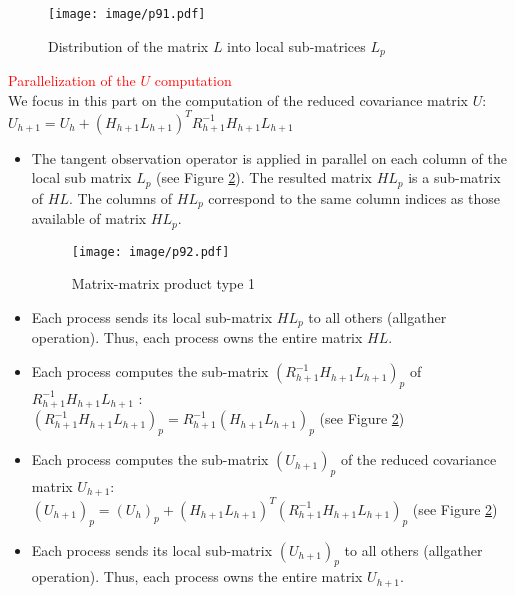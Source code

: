 \documentclass{tufte-book}
\begin{document}
   \begin{figure}[htpb]
    \texttt{[image: image/p91.pdf]}
    \label{l_distribution}
    \caption{Distribution of the matrix $L$ into local sub-matrices $L_p$}
  \end{figure}

  \par \textcolor{red}{Parallelization of the $U$ computation}\\

  We focus in this part on the computation of the reduced covariance matrix $U$:\\
 $ U_{h+1} = U_h +  (H_{h+1}L_{h+1})^T R_{h+1}^{-1} H_{h+1}L_{h+1}$\\


  \begin{itemize}

\item The tangent observation operator is applied in parallel on each column of the local sub matrix $L_p$ (see Figure \ref{matrix_1}). The resulted matrix $HL_p$ is a sub-matrix of $HL$. The columns of $HL_p$ correspond to the same column indices as those available of matrix $HL_p$.

\begin{figure}[htpb]
        \texttt{[image: image/p92.pdf]}
        \caption{Matrix-matrix product type 1}
        \label{matrix_1}
\end{figure}


\item Each process sends its local sub-matrix $HL_p$ to all others (allgather operation). Thus, each process owns the entire matrix  $HL$.\\

\item Each process computes the sub-matrix  $(R_{h+1}^{-1} H_{h+1}L_{h+1})_p$ of  $R_{h+1}^{-1} H_{h+1}L_{h+1}$ :\\
$(R_{h+1}^{-1} H_{h+1}L_{h+1})_p = R_{h+1}^{-1} (H_{h+1}L_{h+1})_p$ (see Figure \ref{matrix_1})

\item Each process computes the sub-matrix   $(U_{h+1})_p$  of  the reduced covariance matrix $U_{h+1}$:\\
 $ (U_{h+1})_p = (U_h)_p +  (H_{h+1}L_{h+1})^T (R_{h+1}^{-1} H_{h+1}L_{h+1})_p$ (see Figure \ref{matrix_1})

 \item Each process sends its local sub-matrix  $ (U_{h+1})_p$ to all others (allgather operation). Thus, each process owns the entire matrix  $U_{h+1}$.\\

\end{itemize}
\end{document}
